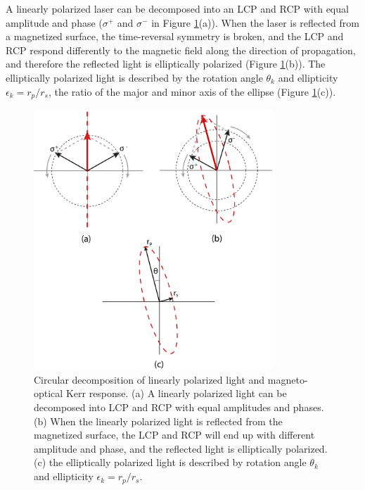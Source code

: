 \documentclass[pdflatex, sectionletters, 12pt, final, phd]{pittetd}    %
\begin{document}
A linearly polarized laser can be decomposed into an LCP and RCP with equal amplitude and phase ($\sigma^+$ and $\sigma^-$ in Figure \ref{FIG:CircularDecompose}(a)). When the laser is reflected from a magnetized surface, the time-reversal symmetry is broken, and the LCP and RCP respond differently to the magnetic field along the direction of propagation, and therefore the reflected light is elliptically polarized (Figure \ref{FIG:CircularDecompose}(b)). The elliptically polarized light is described by the rotation angle $\theta_k$ and ellipticity $\epsilon_k = r_p/r_s$, the ratio of the major and minor axis of the ellipse (Figure \ref{FIG:CircularDecompose}(c)).

\begin{figure}[p]
	\centering
	\includegraphics[width=0.8\textwidth]{Drawing/CircularDecompose.pdf}
	\caption[Circular decompositions]{Circular decomposition of linearly polarized light and magneto-optical Kerr response. (a) A linearly polarized light can be decomposed into LCP and RCP with equal amplitudes and phases. (b) When the linearly polarized light is reflected from the magnetized surface, the LCP and RCP will end up with different amplitude and phase, and the reflected light is elliptically polarized. (c) the elliptically polarized light is described by rotation angle $\theta_k$ and ellipticity $\epsilon_k = r_p/r_s$.}
	\label{FIG:CircularDecompose}
\end{figure}
\end{document}
